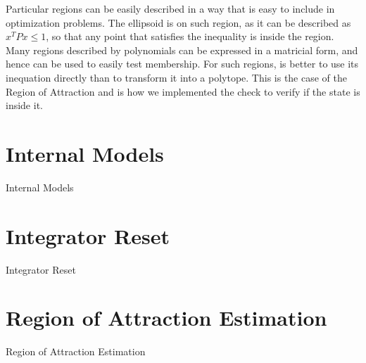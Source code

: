 Particular regions can be easily described in a way that is easy to include in
optimization problems. The ellipsoid is on such region, as it can be described
as \(x^{T}Px\leq{}1\), so that any point that satisfies the inequality is inside
the region. Many regions described by polynomials can be expressed in a matricial
form, and hence can be used to easily test membership. For such regions, is
better to use its inequation directly than to transform it into a polytope.
This is the case of the Region of Attraction and is how we implemented the check
to verify if the state is inside it.

\section{Internal Models}%
\label{sec:internal-models}

Internal Models

\section{Integrator Reset}%
\label{sec:integrator-reset}

Integrator Reset

\section{Region of Attraction Estimation}%
\label{sec:roa-estimation}

Region of Attraction Estimation
